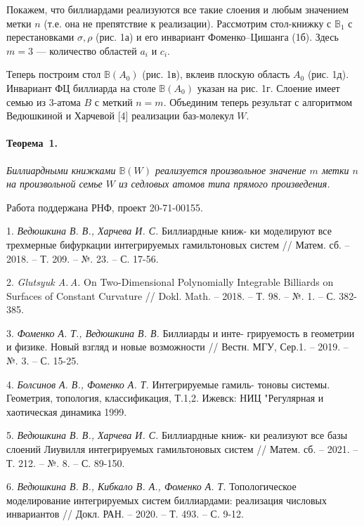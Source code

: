 \documentclass{vzmsthesis}
\begin{document}
Покажем, что биллиардами реализуются все такие слоения и любым значением метки $n$ (т.е. она не препятствие к реализации). Рассмотрим стол-книжку с  $\mathbb{B}_1$ с перестановками $\sigma, \rho$ (рис. 1а) и его инвариант Фоменко--Цишанга (1б). Здесь $m = 3$ --- количество областей $a_i$ и $c_i$. 

Теперь построим стол $\mathbb{B}(A_0)$ (рис. 1в), вклеив плоскую область $A_0$ (рис. 1д). Инвариант ФЦ биллиарда на столе $\mathbb{B}(A_0)$ указан на рис. 1г. Слоение имеет семью из 3-атома $B$ с меткий $n = m$. Объединим теперь результат с алгоритмом Ведюшкиной и Харчевой [4]  реализации баз-молекул $W$.

\paragraph{Теорема~1.}
{\it
	Биллиардными книжками $\mathbb{B}(W)$ реализуется произвольное значение $m$ метки $n$ на произвольной семье $W$ из седловых атомов типа прямого произведения. 
}

Работа поддержана РНФ, проект 20-71-00155. 

\begin{figure}[h]
			\label{elementarybilliards}
		\end{figure}


\litlist

1. {\it Ведюшкина В. В., Харчева И. С.}
 Биллиардные книж-
ки моделируют все трехмерные бифуркации интегрируемых гамильтоновых систем // Матем. сб. – 2018. – Т. 209. – №. 23. – С. 17-56.

2. {\it Glutsyuk A.\,A.} On Two-Dimensional Polynomially Integrable Billiards
on Surfaces of Constant Curvature // Dokl. Math. – 2018. – Т. 98. – №. 1. – С. 382-385.

3. {\it Фоменко А. Т., Ведюшкина В. В.} Биллиарды и инте-
грируемость в геометрии и физике. Новый взгляд и новые возможности // Вестн. МГУ, Сер.1. – 2019. – №. 3. – С. 15-25.

4. {\it Болсинов А. В., Фоменко А. Т.}
Интегрируемые гамиль-
тоновы системы. Геометрия, топология, классификация, Т.1,2.
Ижевск: НИЦ "Регулярная и хаотическая динамика 1999.

5. {\it Ведюшкина В. В., Харчева И. С.}
 Биллиардные книж-
ки реализуют все базы слоений Лиувилля интегрируемых гамильтоновых систем // Матем. сб. – 2021. – Т. 212. – №. 8. – С. 89-150.

6. {\it Ведюшкина В. В.,  Кибкало В. А., Фоменко А. Т.} Топологическое моделирование интегрируемых систем биллиардами: реализация числовых инвариантов // Докл. РАН. – 2020. – Т. 493. – С. 9-12.
\end{document}
